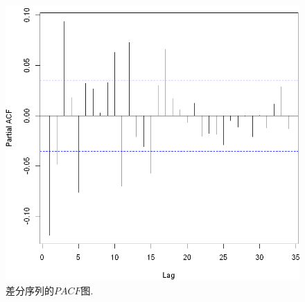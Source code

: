 \documentclass[11pt]{article}
\begin{document}
\begin{center}
\begin{minipage}{0.45\textwidth}
\begin{figure}
            \hspace{-25pt}\includegraphics[width=.9\textwidth]{output_9_0}
            \caption{差分序列的$PACF$图.\label{fig:4}}
        \end{figure}
    \end{minipage}
\end{center}
\end{document}

